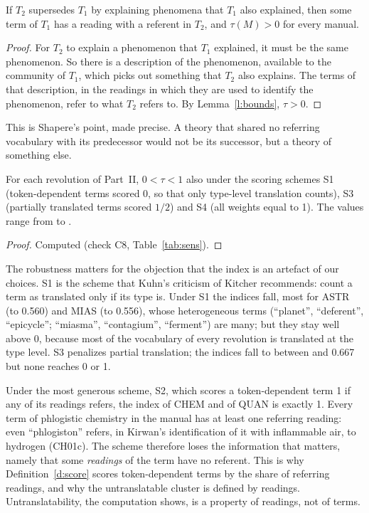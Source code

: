 \documentclass{situationist-preprint}
\begin{document}
\begin{proposition}\label{p:nototal}
If $T_2$ supersedes $T_1$ by explaining phenomena that $T_1$ also explained, then some term of $T_1$ has a reading with a referent in $T_2$, and $\tau(M) > 0$ for every manual.
\end{proposition}

\begin{proof}
For $T_2$ to explain a phenomenon that $T_1$ explained, it must be the same phenomenon. So there is a description of the phenomenon, available to the community of $T_1$, which picks out something that $T_2$ also explains. The terms of that description, in the readings in which they are used to identify the phenomenon, refer to what $T_2$ refers to. By Lemma~\ref{l:bounds}, $\tau>0$.
\end{proof}

This is Shapere's point, made precise. A theory that shared no referring vocabulary with its predecessor would not be its successor, but a theory of something else.

\begin{proposition}[Robustness]\label{p:robust}
For each revolution of Part~II, $0<\tau<1$ also under the scoring schemes S1 (token-dependent terms scored 0, so that only type-level translation counts), S3 (partially translated terms scored $1/2$) and S4 (all weights equal to 1). The values range from \sensmin{} to \sensmax{}.
\end{proposition}

\begin{proof}
Computed (check C8, Table~\ref{tab:sens}).
\end{proof}

The robustness matters for the objection that the index is an artefact of our choices. S1 is the scheme that Kuhn's criticism of Kitcher recommends: count a term as translated only if its type is. Under S1 the indices fall, most for ASTR (to 0.560) and MIAS (to 0.556), whose heterogeneous terms (\enquote{planet}, \enquote{deferent}, \enquote{epicycle}; \enquote{miasma}, \enquote{contagium}, \enquote{ferment}) are many; but they stay well above 0, because most of the vocabulary of every revolution is translated at the type level. S3 penalizes partial translation; the indices fall to between \sensmin{} and 0.667 but none reaches 0 or 1.

\begin{remark}\label{r:s2}
Under the most generous scheme, S2, which scores a token-dependent term 1 if any of its readings refers, the index of CHEM and of QUAN is exactly 1. Every term of phlogistic chemistry in the manual has at least one referring reading: even \enquote{phlogiston} refers, in Kirwan's identification of it with inflammable air, to hydrogen (CH01c). The scheme therefore loses the information that matters, namely that some \emph{readings} of the term have no referent. This is why Definition~\ref{d:score} scores token-dependent terms by the share of referring readings, and why the untranslatable cluster is defined by readings. Untranslatability, the computation shows, is a property of readings, not of terms.
\end{remark}
\end{document}
